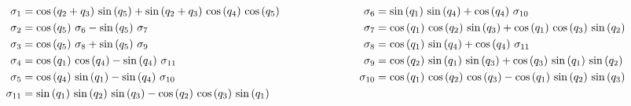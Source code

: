 \documentclass[11pt, a4paper]{article}
\begin{document}
\begin{lrbox}{\rotpagebox}
\begin{minipage}[t][\textwidth][t]{\textheight}
\vspace{12pt}

\[
\begin{aligned}
\sigma_1 &= \cos \left(q_2 +q_3 \right)\,\sin \left(q_5 \right)+\sin \left(q_2 +q_3 \right)\,\cos \left(q_4 \right)\,\cos \left(q_5 \right) &\hspace{2.2cm} \sigma_6 &= \sin \left(q_1 \right)\,\sin \left(q_4 \right)+\cos \left(q_4 \right)\,\sigma_{10}\\
\sigma_2 &= \cos \left(q_5 \right)\,\sigma_6 -\sin \left(q_5 \right)\,\sigma_7 &\hspace{2.2cm} \sigma_7 &= \cos \left(q_1 \right)\,\cos \left(q_2 \right)\,\sin \left(q_3 \right)+\cos \left(q_1 \right)\,\cos \left(q_3 \right)\,\sin \left(q_2 \right) \\
\sigma_3 &= \cos \left(q_5 \right)\,\sigma_8 +\sin \left(q_5 \right)\,\sigma_9 &\hspace{2.2cm} \sigma_8 &= \cos \left(q_1 \right)\,\sin \left(q_4 \right)+\cos \left(q_4 \right)\,\sigma_{11} \\
\sigma_4 &= \cos \left(q_1 \right)\,\cos \left(q_4 \right)-\sin \left(q_4 \right)\,\sigma_{11} &\hspace{2.2cm} \sigma_9 &= \cos \left(q_2 \right)\,\sin \left(q_1 \right)\,\sin \left(q_3 \right)+\cos \left(q_3 \right)\,\sin \left(q_1 \right)\,\sin \left(q_2 \right) \\
\sigma_5 &= \cos \left(q_4 \right)\,\sin \left(q_1 \right)-\sin \left(q_4 \right)\,\sigma_{10} &\hspace{2.2cm} \sigma_{10} &= \cos \left(q_1 \right)\,\cos \left(q_2 \right)\,\cos \left(q_3 \right)-\cos \left(q_1 \right)\,\sin \left(q_2 \right)\,\sin \left(q_3 \right) \\
\sigma_{11} &= \sin \left(q_1 \right)\,\sin \left(q_2 \right)\,\sin \left(q_3 \right)-\cos \left(q_2 \right)\,\cos \left(q_3 \right)\,\sin \left(q_1 \right) &\hspace{2.2cm}
\end{aligned}
\]
\end{minipage}
\end{lrbox}
\noindent{}
\end{document}
